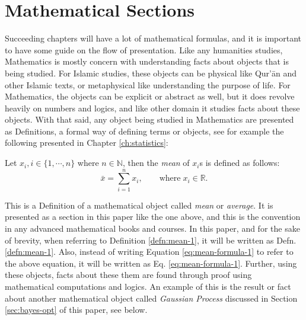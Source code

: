\section{Mathematical Sections}
Succeeding chapters will have a lot of mathematical formulas, and it is important to have some guide on the flow of presentation. Like any humanities studies, Mathematics is mostly concern with understanding facts about objects that is being studied. For Islamic studies, these objects can be physical like Qur'\=an and other Islamic texts, or metaphysical like understanding the purpose of life. For Mathematics, the objects can be explicit or abstract as well, but it does revolve heavily on numbers and logics, and like other domain it studies facts about these objects. With that said, any object being studied in Mathematics are presented as Definitions, a formal way of defining terms or objects, see for example the following presented in Chapter \ref{ch:statistics}:
\begin{defn}[Mean]\label{defn:mean-1}
Let $x_i, i\in\{1,\cdots,n\}$ where $n\in\mathbb{N}$, then the \textit{mean} of $x_i$s is defined as follows:
\begin{equation}\label{eq:mean-formula-1}
    \bar{x} = \sum_{i=1}^n x_i, \qquad\text{where}\;x_i \in\mathbb{R}.
\end{equation}
\end{defn}
This is a Definition of a mathematical object called \textit{mean} or \textit{average}. It is presented as a section in this paper like the one above, and this is the convention in any advanced mathematical books and courses. In this paper, and for the sake of brevity, when referring to Definition \ref{defn:mean-1}, it will be written as Defn. \ref{defn:mean-1}. Also, instead of writing Equation \ref{eq:mean-formula-1} to refer to the above equation, it will be written as Eq. \ref{eq:mean-formula-1}. Further, using these objects, facts about these them are found through proof using mathematical computations and logics. An example of this is the result or fact about another mathematical object called \textit{Gaussian Process} discussed in Section \ref{sec:bayes-opt} of this paper, see below.
